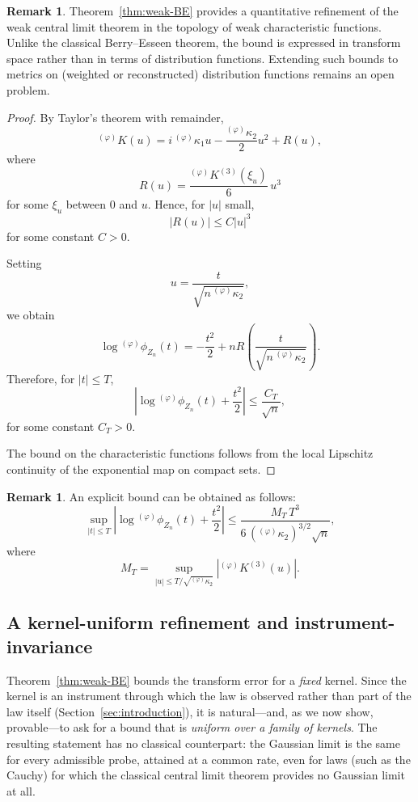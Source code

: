 \documentclass[12pt]{article}
\theoremstyle{definition}
\newtheorem{remark}[theorem]{Remark}
\begin{document}
\begin{remark}
Theorem~\ref{thm:weak-BE} provides a quantitative refinement of the weak
central limit theorem in the topology of weak characteristic functions.
Unlike the classical Berry--Esseen theorem, the bound is expressed in
transform space rather than in terms of distribution functions. Extending
such bounds to metrics on (weighted or reconstructed) distribution
functions remains an open problem.
\end{remark}

\begin{proof}
By Taylor's theorem with remainder,
\[
{}^{(\varphi)}K(u)
=
i\,{}^{(\varphi)}\kappa_1 u
-
\frac{{}^{(\varphi)}\kappa_2}{2}u^2
+
R(u),
\]
where
\[
R(u)
=
\frac{{}^{(\varphi)}K^{(3)}(\xi_u)}{6}\,u^3
\]
for some \(\xi_u\) between \(0\) and \(u\). Hence, for \(|u|\) small,
\[
|R(u)| \le C |u|^3
\]
for some constant \(C>0\).

Setting
\[
u = \frac{t}{\sqrt{n\,{}^{(\varphi)}\kappa_2}},
\]
we obtain
\[
\log {}^{(\varphi)}\phi_{Z_n}(t)
=
-\frac{t^2}{2}
+
n R\!\left(\frac{t}{\sqrt{n\,{}^{(\varphi)}\kappa_2}}\right).
\]
Therefore, for \(|t|\le T\),
\[
\left|
\log {}^{(\varphi)}\phi_{Z_n}(t)
+
\frac{t^2}{2}
\right|
\le
\frac{C_T}{\sqrt{n}},
\]
for some constant \(C_T>0\).

The bound on the characteristic functions follows from the local Lipschitz
continuity of the exponential map on compact sets.
\end{proof}

\begin{remark}
An explicit bound can be obtained as follows:
\[
\sup_{|t|\le T}
\left|
\log {}^{(\varphi)}\phi_{Z_n}(t)
+
\frac{t^2}{2}
\right|
\le
\frac{M_T\,T^3}{6\,({}^{(\varphi)}\kappa_2)^{3/2}\sqrt{n}},
\]
where
\[
M_T
=
\sup_{|u|\le T/\sqrt{{}^{(\varphi)}\kappa_2}}
\left|
{}^{(\varphi)}K^{(3)}(u)
\right|.
\]
\end{remark}


\subsection{A kernel-uniform refinement and instrument-invariance}
\label{subsec:clt_uniform}

Theorem~\ref{thm:weak-BE} bounds the transform error for a \emph{fixed}
kernel.  Since the kernel is an instrument through which the law is observed
rather than part of the law itself (Section~\ref{sec:introduction}), it is
natural---and, as we now show, provable---to ask for a bound that is
\emph{uniform over a family of kernels}.  The resulting statement has no
classical counterpart: the Gaussian limit is the same for every admissible
probe, attained at a common rate, even for laws (such as the Cauchy) for
which the classical central limit theorem provides no Gaussian limit at all.
\end{document}
